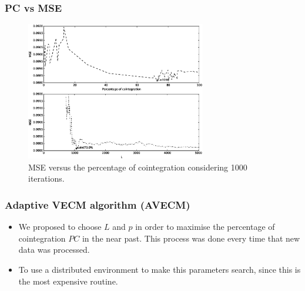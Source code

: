 \documentclass{beamer}
\begin{document}
\begin{frame}
\begin{columns}
\begin{column}{0.3\textwidth}
\begin{figure}[!h]
 \end{figure}
\end{column}
\end{columns}
\end{frame}


\begin{frame}
\frametitle{PC vs MSE}
\begin{figure}[ht!]
  \centering
  \includegraphics[width=0.7\textwidth]{img/51_Fig2}
  \caption{MSE versus the percentage of cointegration considering 1000
  iterations. }
  \label{fig:cointvsmse}
\end{figure}
\end{frame}
%
\begin{frame}
\frametitle{Adaptive VECM algorithm (AVECM)}
\begin{itemize}
\item We proposed to choose $L$ and $p$ in order to maximise the percentage of
cointegration $PC$ in the near past. This process was done every time that new data was processed. 
\item To use a distributed environment to make this parameters search, since this is the most expensive routine.
\end{itemize}
\end{frame}
\end{document}
